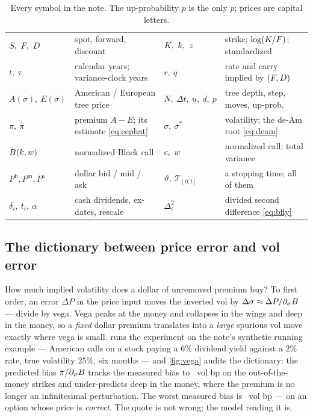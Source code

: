 \documentclass[11pt]{article}
\begin{document}
\begin{table}[H]
\centering\footnotesize
\setlength{\tabcolsep}{4pt}
\begin{tabular}{@{}llll@{}}
\toprule
$S,\ \fwd,\ D$ & spot, forward, discount &
$K,\ \logm,\ z$ & strike; $\log(K/F)$; standardized\\[2pt]
$t,\ \tau$ & calendar years; variance-clock years &
$r,\ q$ & rate and carry implied by $(F,D)$\\[2pt]
$A(\sigma),\ E(\sigma)$ & American / European tree price &
$N,\ \Delta t,\ u,\ d,\ p$ & tree depth, step, moves, up-prob.\\[2pt]
$\pi,\ \hat\pi$ & premium $A-E$; its estimate \eqref{eq:eephat} &
$\sigma,\ \sigma^*$ & volatility; the de-Am root \eqref{eq:deam}\\[2pt]
$B(k,w)$ & normalized Black call &
$c,\ \tvar$ & normalized call; total variance\\[2pt]
$P^{\mathrm b},P^{\mathrm m},P^{\mathrm a}$ & dollar bid / mid / ask &
$\vartheta,\ \mathcal T_{[0,t]}$ & a stopping time; all of them\\[2pt]
$\delta_i,\ t_i,\ \alpha$ & cash dividends, ex-dates, rescale &
$\Delta^2_i$ & divided second difference \eqref{eq:bfly}\\
\bottomrule
\end{tabular}
\caption{Every symbol in the note.  The up-probability $p$ is the only $p$;
prices are capital letters.}
\label{tab:ledger}
\end{table}

\subsection{The dictionary between price error and vol error}
\label{sec:dictionary}

How much implied volatility does a dollar of unremoved premium buy?  To
first order, an error $\Delta P$ in the price input moves the inverted vol
by $\Delta\sigma\approx\Delta P/\partial_\sigma B$ --- divide by vega.
Vega peaks at the money and collapses in the wings and deep in the money,
so a \emph{fixed} dollar premium translates into a \emph{large} spurious
vol move exactly where vega is small.   runs the experiment
on the note's synthetic running example --- American calls on a stock
paying a $6\%$ dividend yield against a $2\%$ rate, true volatility
$25\%$, six months --- and \cref{fig:vega} audits the dictionary: the
predicted bias $\pi/\partial_\sigma B$ tracks the measured bias to
\deamstvegaotmerr\ vol bp on the out-of-the-money strikes and under-predicts
deep in the money, where the premium is no longer an infinitesimal
perturbation.  The worst measured bias is \deamstmaxbias\ vol bp --- on an
option whose price is \emph{correct}.  The quote is not wrong; the model
reading it is.
\end{document}
